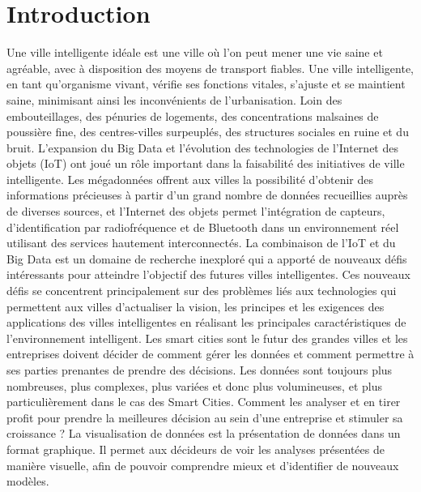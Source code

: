 \documentclass[french, a4paper, 12pt]{report}
\begin{document}
\chapter*{Introduction}
Une ville intelligente idéale est une ville où l’on peut mener une vie saine et agréable, avec à disposition des moyens de transport fiables. Une ville intelligente, en tant qu’organisme vivant, vérifie ses fonctions vitales, s’ajuste et se maintient saine, minimisant ainsi les inconvénients de l’urbanisation. Loin des embouteillages, des pénuries de logements, des concentrations malsaines de poussière fine, des centres-villes surpeuplés, des structures sociales en ruine et du bruit.
L'expansion du Big Data et l'évolution des technologies de l'Internet des objets (IoT) ont joué un rôle important dans la faisabilité des initiatives de ville intelligente. Les mégadonnées offrent aux villes la possibilité d’obtenir des informations précieuses à partir d’un grand nombre de données recueillies auprès de diverses sources, et l’Internet des objets permet l’intégration de capteurs, d’identification par radiofréquence et de Bluetooth dans un environnement réel utilisant des services hautement interconnectés. La combinaison de l'IoT  et du Big Data est un domaine de recherche inexploré qui a apporté de nouveaux défis intéressants pour atteindre l'objectif des futures villes intelligentes. Ces nouveaux défis se concentrent principalement sur des problèmes liés aux technologies qui permettent aux villes d’actualiser la vision, les principes et les exigences des applications des villes intelligentes en réalisant les principales caractéristiques de l’environnement intelligent.
Les smart cities sont le futur des grandes villes et les entreprises doivent décider de comment gérer les données et comment permettre à ses parties prenantes de prendre des décisions. 
Les données sont toujours plus nombreuses, plus complexes, plus variées et donc plus volumineuses, et plus particulièrement dans le cas des Smart Cities. 
Comment les analyser et en tirer profit pour prendre la meilleures décision au sein d’une entreprise et stimuler sa croissance ? 
La visualisation de données est la présentation de données dans un format graphique. Il permet aux décideurs de voir les analyses présentées de manière visuelle, afin de pouvoir comprendre mieux et d’identifier de nouveaux modèles. 
\end{document}
